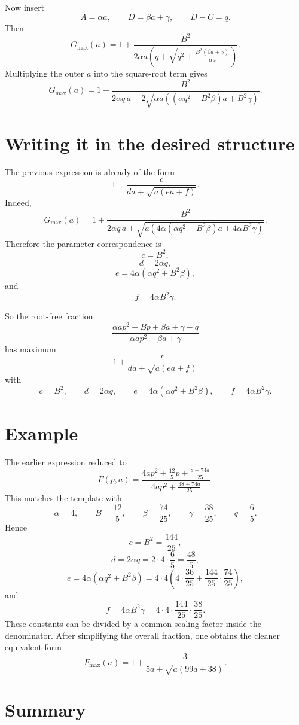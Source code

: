 \documentclass[11pt]{article}
\begin{document}
Now insert
\[
A=\alpha a,
\qquad
D=\beta a+\gamma,
\qquad
D-C=q.
\]
Then
\[
G_{\max}(a)
=
1+
\frac{B^2}
{2\alpha a\left(q+\sqrt{q^2+\frac{B^2(\beta a+\gamma)}{\alpha a}}\right)}.
\]
Multiplying the outer \(a\) into the square-root term gives
\[
\boxed{
G_{\max}(a)
=
1+
\frac{B^2}
{
2\alpha q\,a
+
2\sqrt{\alpha a\left((\alpha q^2+B^2\beta)a+B^2\gamma\right)}
}.
}
\]

\section{Writing it in the desired structure}

The previous expression is already of the form
\[
1+\frac{c}{da+\sqrt{a(ea+f)}}.
\]
Indeed,
\[
G_{\max}(a)
=
1+
\frac{B^2}
{
2\alpha q\,a
+
\sqrt{
a\left(
4\alpha(\alpha q^2+B^2\beta)a
+
4\alpha B^2\gamma
\right)
}
}.
\]
Therefore the parameter correspondence is
\[
\boxed{
c=B^2,
}
\]
\[
\boxed{
d=2\alpha q,
}
\]
\[
\boxed{
e=4\alpha(\alpha q^2+B^2\beta),
}
\]
and
\[
\boxed{
f=4\alpha B^2\gamma.
}
\]

So the root-free fraction
\[
\boxed{
\frac{\alpha a p^2+Bp+\beta a+\gamma-q}
{\alpha a p^2+\beta a+\gamma}
}
\]
has maximum
\[
\boxed{
1+\frac{c}{da+\sqrt{a(ea+f)}}
}
\]
with
\[
\boxed{
c=B^2,\qquad
d=2\alpha q,\qquad
e=4\alpha(\alpha q^2+B^2\beta),\qquad
f=4\alpha B^2\gamma.
}
\]

\section{Example}

The earlier expression reduced to
\[
F(p,a)
=
\frac{
4ap^2+\frac{12}{5}p+\frac{8+74a}{25}
}{
4ap^2+\frac{38+74a}{25}
}.
\]
This matches the template with
\[
\alpha=4,
\qquad
B=\frac{12}{5},
\qquad
\beta=\frac{74}{25},
\qquad
\gamma=\frac{38}{25},
\qquad
q=\frac65.
\]
Hence
\[
c=B^2=\frac{144}{25},
\]
\[
d=2\alpha q
=2\cdot4\cdot\frac65
=\frac{48}{5},
\]
\[
e=4\alpha(\alpha q^2+B^2\beta)
=4\cdot4\left(4\cdot\frac{36}{25}+\frac{144}{25}\cdot\frac{74}{25}\right),
\]
and
\[
f=4\alpha B^2\gamma
=4\cdot4\cdot\frac{144}{25}\cdot\frac{38}{25}.
\]
These constants can be divided by a common scaling factor inside the denominator.
After simplifying the overall fraction, one obtains the cleaner equivalent form
\[
\boxed{
F_{\max}(a)
=
1+\frac{3}{5a+\sqrt{a(99a+38)}}.
}
\]

\section{Summary}
\end{document}
